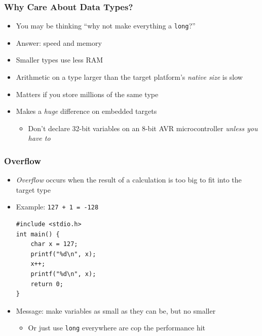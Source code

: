 \documentclass[14pt]{beamer}
\begin{document}
\begin{frame}
\frametitle{Why Care About Data Types?}
\begin{itemize}
\item You may be thinking ``why not make everything a \texttt{long}?''
\item Answer: speed and memory
\item Smaller types use less RAM
\item Arithmetic on a type larger than the target platform's \textit{native size} is slow
\item Matters if you store millions of the same type
\item Makes a \textit{huge} difference on embedded targets
\begin{itemize}
	\item Don't declare 32-bit variables on an 8-bit AVR microcontroller \textit{unless you have to}
\end{itemize}
\end{itemize}
\end{frame}

\begin{frame}[fragile]
\frametitle{Overflow}
\small{
\begin{itemize}
\item \textit{Overflow} occurs when the result of a calculation is too big to fit into the target type
\item Example: \texttt{127 + 1 = -128}
\begin{lstlisting}[style=CStyle]
#include <stdio.h>
int main() {
	char x = 127;
	printf("%d\n", x);
	x++;
	printf("%d\n", x);
	return 0;
}
\end{lstlisting}
\item Message: make variables as small as they can be, but no smaller
	\begin{itemize}
		\item Or just use \texttt{long} everywhere are cop the performance hit
	\end{itemize}
\end{itemize}
}
\end{frame}
\end{document}
